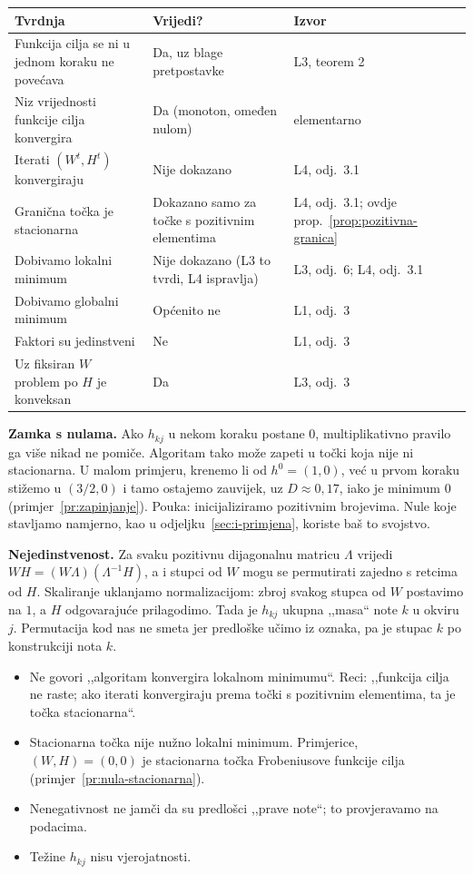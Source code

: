 \documentclass[11pt,a4paper]{article}
\theoremstyle{definition}
\theoremstyle{plain}
\theoremstyle{remark}
\begin{document}
\begin{center}
\small
\begin{tabularx}{\linewidth}{@{}Y>{\raggedright\arraybackslash}p{3.4cm}>{\raggedright\arraybackslash}p{3.2cm}@{}}
\toprule
\textbf{Tvrdnja} & \textbf{Vrijedi?} & \textbf{Izvor}\\
\midrule
Funkcija cilja se ni u jednom koraku ne povećava & Da, uz blage pretpostavke & L3, teorem 2\\
Niz vrijednosti funkcije cilja konvergira & Da (monoton, omeđen nulom) & elementarno\\
Iterati $(W^t,H^t)$ konvergiraju & Nije dokazano & L4, odj.~3.1\\
Granična točka je stacionarna & Dokazano samo za točke s pozitivnim elementima & L4, odj.~3.1; ovdje prop.~\ref{prop:pozitivna-granica}\\
Dobivamo lokalni minimum & Nije dokazano (L3 to tvrdi, L4 ispravlja) & L3, odj.~6; L4, odj.~3.1\\
Dobivamo globalni minimum & Općenito ne & L1, odj.~3\\
Faktori su jedinstveni & Ne & L1, odj.~3\\
Uz fiksiran $W$ problem po $H$ je konveksan & Da & L3, odj.~3\\
\bottomrule
\end{tabularx}
\end{center}

\textbf{Zamka s nulama.} Ako $h_{kj}$ u nekom koraku postane $0$, multiplikativno pravilo ga više
nikad ne pomiče. Algoritam tako može zapeti u točki koja nije ni stacionarna. U malom primjeru,
krenemo li od $h^0=(1,0)$, već u prvom koraku stižemo u $(3/2,0)$ i tamo ostajemo zauvijek, uz
$D\approx0{,}17$, iako je minimum $0$ (primjer~\ref{pr:zapinjanje}). Pouka: inicijaliziramo
pozitivnim brojevima. Nule koje stavljamo namjerno, kao u odjeljku~\ref{sec:i-primjena}, koriste baš
to svojstvo.

\textbf{Nejedinstvenost.} Za svaku pozitivnu dijagonalnu matricu $\Lambda$ vrijedi
$WH=(W\Lambda)(\Lambda^{-1}H)$, a i stupci od $W$ mogu se permutirati zajedno s retcima od $H$.
Skaliranje uklanjamo normalizacijom: zbroj svakog stupca od $W$ postavimo na $1$, a $H$
odgovarajuće prilagodimo. Tada je $h_{kj}$ ukupna ,,masa`` note $k$ u okviru $j$. Permutacija kod
nas ne smeta jer predloške učimo iz oznaka, pa je stupac $k$ po konstrukciji nota $k$.

\begin{oprez}
\begin{itemize}
\item Ne govori ,,algoritam konvergira lokalnom minimumu``. Reci: ,,funkcija cilja ne raste; ako
  iterati konvergiraju prema točki s pozitivnim elementima, ta je točka stacionarna``.
\item Stacionarna točka nije nužno lokalni minimum. Primjerice, $(W,H)=(0,0)$ je stacionarna točka
  Frobeniusove funkcije cilja (primjer~\ref{pr:nula-stacionarna}).
\item Nenegativnost ne jamči da su predlošci ,,prave note``; to provjeravamo na podacima.
\item Težine $h_{kj}$ nisu vjerojatnosti.
\end{itemize}
\end{oprez}
\end{document}
